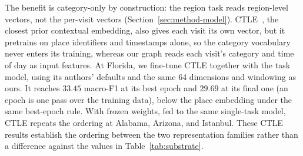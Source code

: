 The benefit is category-only by construction: the region task reads region-level vectors, not the
per-visit vectors (Section~\ref{sec:method-model}).
CTLE~\cite{lin2021ctle}, the closest prior contextual embedding, also gives each visit its own vector, but it pretrains on place identifiers and timestamps alone, so the category vocabulary never enters its training, whereas our graph reads each visit's category and time of day as input features. At Florida, we fine-tune CTLE together with the task model, using its authors' defaults and the same 64 dimensions and windowing as ours. It reaches $33.45$ macro-F1 at its best epoch and $29.69$ at its final one (an epoch is one pass over the training data), below the place embedding under the same best-epoch rule.
With frozen weights, fed to the same single-task model, CTLE repeats the ordering at Alabama, Arizona, and Istanbul. These CTLE results establish the ordering between the two representation families rather than a
difference against the values in Table~\ref{tab:substrate}.
